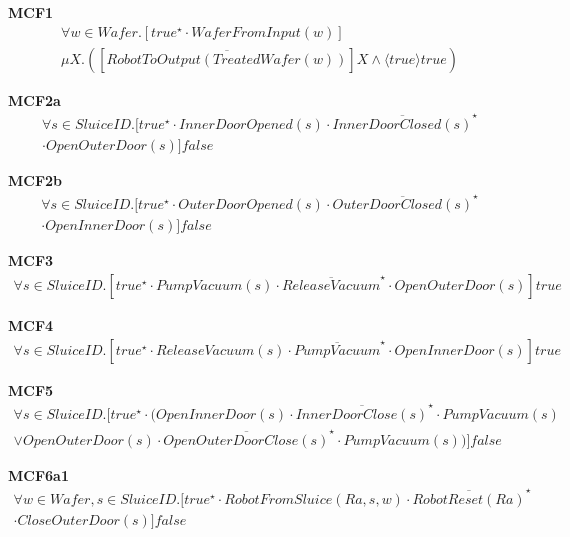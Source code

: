 \documentclass[12pt]{report}
\begin{document}
    \textbf{MCF1}
    \begin{multline*}
        \forall w \in \mathit{Wafer}. [true^{\star} \cdot \mathit{Wafer}FromInput(w)]\\
        \mu X.([\overline{RobotToOutput(Treated\mathit{Wafer}(w))}]X \wedge \langle true \rangle true)
    \end{multline*}

    \textbf{MCF2a}
    \begin{multline*}
        \forall s \in SluiceID.[true^{\star} \cdot InnerDoorOpened(s) \cdot \overline{InnerDoorClosed(s)}^{\star}\\
         \cdot OpenOuterDoor(s)]false
    \end{multline*}

    \textbf{MCF2b}
    \begin{multline*}
        \forall s \in SluiceID.[true^{\star} \cdot OuterDoorOpened(s) \cdot \overline{OuterDoorClosed(s)}^{\star}\\
         \cdot OpenInnerDoor(s)]false
    \end{multline*}

    \textbf{MCF3}
    \begin{multline*}
        \forall s \in SluiceID. [true^{\star} \cdot PumpVacuum(s) \cdot \overline{ReleaseVacuum}^{\star} \cdot OpenOuterDoor(s)]true
    \end{multline*}

    \textbf{MCF4}
    \begin{multline*}
        \forall s \in SluiceID.[true^{\star} \cdot ReleaseVacuum(s) \cdot \overline{PumpVacuum}^{\star} \cdot OpenInnerDoor(s)]true
    \end{multline*}

    \textbf{MCF5}
    \begin{multline*}
        \forall s \in SluiceID.[true^{\star} \cdot (OpenInnerDoor(s) \cdot \overline{InnerDoorClose(s)}^{\star} \cdot PumpVacuum(s)\\
        \vee OpenOuterDoor(s) \cdot \overline{OpenOuterDoorClose(s)}^{\star} \cdot PumpVacuum(s))]false
    \end{multline*}

    \textbf{MCF6a1}
    \begin{multline*}
        \forall w \in \mathit{Wafer}, s \in SluiceID.[true^{\star} \cdot RobotFromSluice(Ra,s,w) \cdot \overline{RobotReset(Ra)}^{\star}\\
        \cdot CloseOuterDoor(s)]false
    \end{multline*}
\end{document}
